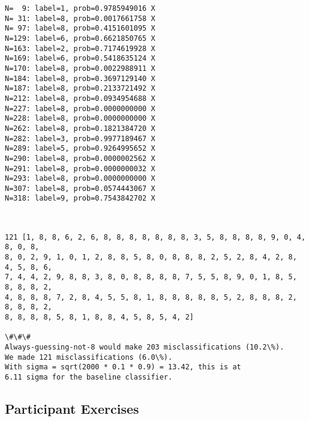 \documentclass[11pt]{article}
\begin{document}
    \begin{Verbatim}[commandchars=\\\{\}]
N=  9: label=1, prob=0.9785949016 X
N= 31: label=8, prob=0.0017661758 X
N= 97: label=8, prob=0.4151601095 X
N=129: label=6, prob=0.6621850765 X
N=163: label=2, prob=0.7174619928 X
N=169: label=6, prob=0.5418635124 X
N=170: label=8, prob=0.0022988911 X
N=184: label=8, prob=0.3697129140 X
N=187: label=8, prob=0.2133721492 X
N=212: label=8, prob=0.0934954688 X
N=227: label=8, prob=0.0000000000 X
N=228: label=8, prob=0.0000000000 X
N=262: label=8, prob=0.1821384720 X
N=282: label=3, prob=0.9977189467 X
N=289: label=5, prob=0.9264995652 X
N=290: label=8, prob=0.0000002562 X
N=291: label=8, prob=0.0000000032 X
N=293: label=8, prob=0.0000000000 X
N=307: label=8, prob=0.0574443067 X
N=318: label=9, prob=0.7543842702 X
    \end{Verbatim}

    \begin{center}
    \end{center}
    { \hspace*{\fill} \\}
    
    \begin{Verbatim}[commandchars=\\\{\}]
121 [1, 8, 8, 6, 2, 6, 8, 8, 8, 8, 8, 8, 8, 3, 5, 8, 8, 8, 8, 9, 0, 4, 8, 0, 8,
8, 0, 2, 9, 1, 0, 1, 2, 8, 8, 5, 8, 0, 8, 8, 8, 2, 5, 2, 8, 4, 2, 8, 4, 5, 8, 6,
7, 4, 4, 2, 9, 8, 8, 3, 8, 0, 8, 8, 8, 8, 7, 5, 5, 8, 9, 0, 1, 8, 5, 8, 8, 8, 2,
4, 8, 8, 8, 7, 2, 8, 4, 5, 5, 8, 1, 8, 8, 8, 8, 8, 5, 2, 8, 8, 8, 2, 8, 8, 8, 2,
8, 8, 8, 8, 5, 8, 1, 8, 8, 4, 5, 8, 5, 4, 2]

\#\#\#
Always-guessing-not-8 would make 203 misclassifications (10.2\%).
We made 121 misclassifications (6.0\%).
With sigma = sqrt(2000 * 0.1 * 0.9) = 13.42, this is at
6.11 sigma for the baseline classifier.
    \end{Verbatim}

    \hypertarget{participant-exercises}{%
\subsection{Participant Exercises}\label{participant-exercises}}
\end{document}

